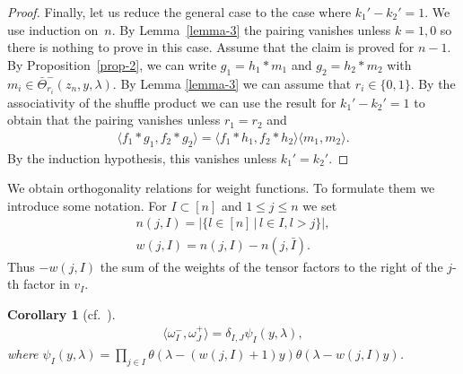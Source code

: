 \documentclass[pdftex]{sigma}
\numberwithin{equation}{section}
\newtheorem{Corollary}[Theorem]{Corollary}
\begin{document}
\begin{proof}
Finally, let us reduce the general case to the case where $k_1'-k_2'=1$. We use induction on~$n$. By Lemma~\ref{lemma-3} the pairing vanishes unless $k=1,0$ so there is nothing to prove in this case. Assume that the claim is proved for $n-1$. By Proposition~\ref{prop-2}, we can write $g_1=h_1*m_1$ and $g_2=h_2*m_2$ with $m_i\in\bar\Theta^-_{r_i}(z_{n},y,\lambda)$. By Lemma \ref{lemma-3} we can assume that $r_i\in\{0,1\}$. By the associativity of the shuffle product we can use the result for $k_1'-k_2'=1$ to obtain that the pairing vanishes unless $r_1=r_2$ and
\begin{gather*}
 \langle f_1*g_1,f_2*g_2\rangle=\langle f_1*h_1,f_2*h_2\rangle\langle m_1,m_2\rangle.
 \end{gather*}
By the induction hypothesis, this vanishes unless $k_1'=k_2'$.
\end{proof}

We obtain orthogonality relations for weight functions. To formulate them we introduce some notation. For $I\subset [n]$ and $1\leq j\leq n$ we set
\begin{gather}
 n(j,I)=|\{l\in[n]\,|\,l\in I, l>j\}|,\nonumber\\
 w(j,I)=n(j,I)-n(j,\bar I).\label{eq-w}
\end{gather}
Thus $-w(j,I)$ the sum of the weights of the tensor factors to the right of the $j$-th factor in $v_I$.
 \begin{Corollary}[{cf.~\cite[Theorem~C.4]{TV2}}]\label{cor-2}
 \begin{gather*}
 \langle\omega^-_I,\omega^+_J\rangle = \delta_{I,J}\psi_I(y,\lambda),
 \end{gather*}
 where $\psi_I(y,\lambda)= \prod\limits_{j\in I}\theta(\lambda-(w(j,I)+1)y)\theta(\lambda-w(j,I)y)$.
 \end{Corollary}
\end{document}
